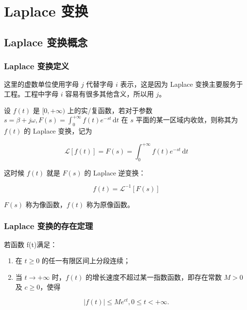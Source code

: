 \section{Laplace 变换}
\label{laplace-变换}
\subsection{Laplace 变换概念}
\label{laplace-变换概念}
\subsubsection{Laplace 变换定义}
\label{laplace-变换定义}
\begin{tcolorbox}[title={Tip},colback=red!5!white
,colframe=red!75!black
,colbacktitle=yellow!50!red
,coltitle=red!25!black, fonttitle=\bfseries,subtitle style={boxrule=0.4pt, colback=yellow!50!red!25!white}]
这里的虚数单位使用字母 \(j\) 代替字母 \(i\) 表示，这是因为
Laplace 变换主要服务于工程。工程中字母 \(i\) 容易有很多其他含义，所以用
\(j\)。

\end{tcolorbox}

设 \(f(t)\) 是 \([0,+\infty)\) 上的实/复函数，若对于参数
\(s = \beta + j \omega,F(s) = \int _{0}^{+\infty}f(t)e^{-st}\,\mathrm{d}t\)
在 \(s\) 平面的某一区域内收敛，则称其为 \(f(t)\) 的 Laplace 变换，记为

\[
\mathcal{L}[f(t)] = F(s) = \int _{0}^{+\infty}f(t)e^{-st}\,\mathrm{d}t
\]

这时候 \(f(t)\) 就是 \(F(s)\) 的 Laplace 逆变换：

\[
f(t) = \mathcal{L}^{-1}[F(s)]
\]

\(F(s)\) 称为像函数，\(f(t)\) 称为原像函数。
\subsubsection{Laplace 变换的存在定理}
\label{laplace-变换的存在定理}
若函数 f(t)满足：

\begin{enumerate}
\item 在 \(t \ge 0\) 的任一有限区间上分段连续；

\item 当 \(t \to +\infty\) 时，\(f(t)\)
的增长速度不超过某一指数函数，即存在常数 \(M>0\) 及 \(c\ge 0\)，使得
\end{enumerate}

\begin{equation*}
|f(t)| \le Me^{ct},0\le t < +\infty.
\end{equation*}

